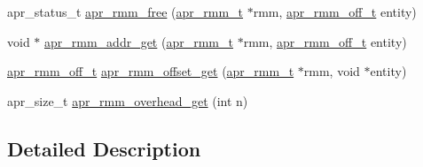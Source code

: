 \begin{DoxyCompactItemize}
\item 
apr\-\_\-status\-\_\-t \hyperlink{group___a_p_r___util___r_m_m_gad22b65c95d0964e37aecd4134294b016}{apr\-\_\-rmm\-\_\-free} (\hyperlink{group___a_p_r___util___r_m_m_gadb4d418c417ece33c4430ba9df59070a}{apr\-\_\-rmm\-\_\-t} $\ast$rmm, \hyperlink{group___a_p_r___util___r_m_m_ga70b508c81a0bc75350efdefb3410af12}{apr\-\_\-rmm\-\_\-off\-\_\-t} entity)
\item 
void $\ast$ \hyperlink{group___a_p_r___util___r_m_m_ga6bf67e9f2d08f9f36d2c420648d8d3a0}{apr\-\_\-rmm\-\_\-addr\-\_\-get} (\hyperlink{group___a_p_r___util___r_m_m_gadb4d418c417ece33c4430ba9df59070a}{apr\-\_\-rmm\-\_\-t} $\ast$rmm, \hyperlink{group___a_p_r___util___r_m_m_ga70b508c81a0bc75350efdefb3410af12}{apr\-\_\-rmm\-\_\-off\-\_\-t} entity)
\item 
\hyperlink{group___a_p_r___util___r_m_m_ga70b508c81a0bc75350efdefb3410af12}{apr\-\_\-rmm\-\_\-off\-\_\-t} \hyperlink{group___a_p_r___util___r_m_m_ga3ed2e880ebc695aa8dd241e21b5a666e}{apr\-\_\-rmm\-\_\-offset\-\_\-get} (\hyperlink{group___a_p_r___util___r_m_m_gadb4d418c417ece33c4430ba9df59070a}{apr\-\_\-rmm\-\_\-t} $\ast$rmm, void $\ast$entity)
\item 
apr\-\_\-size\-\_\-t \hyperlink{group___a_p_r___util___r_m_m_gae638ec990cb1600f6f70a8b3a1e07ff8}{apr\-\_\-rmm\-\_\-overhead\-\_\-get} (int n)
\end{DoxyCompactItemize}


\subsection{Detailed Description}


